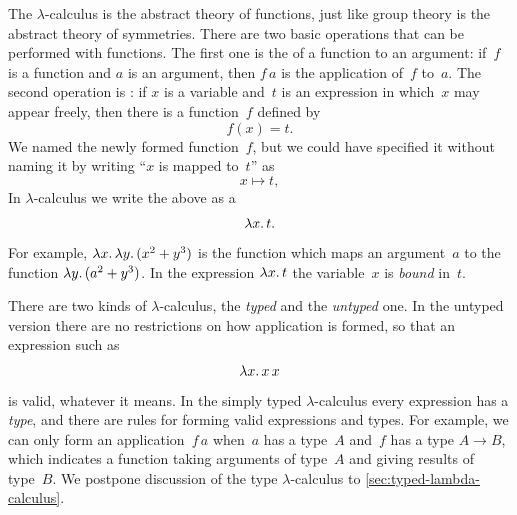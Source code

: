The $\lambda$-calculus is the abstract theory of functions, just like
group theory is the abstract theory of symmetries. There are two basic
operations that can be performed with functions. The first one is the
 of a function to an argument: if~$f$ is a function
and $a$ is an argument, then $f\,a$ is the application of~$f$ to~$a$.
The second operation is : if $x$ is a variable
and~$t$ is an expression in which~$x$ may appear freely, then there is
a function~$f$ defined by
%
\begin{equation*}
  f(x) = t.
\end{equation*}
%
We named the newly formed function~$f$, but we could
have specified it without naming it by writing ``$x$ is mapped to~$t$'' as
%
\begin{equation*}
  x \mapsto t,
\end{equation*}
%
In $\lambda$-calculus we write the above as a 
%
\begin{equation*}
  \lambda x .\,t.
\end{equation*}
%
For example, $\lambda x .\,\lambda y .\,(x^2 + y^3)$ is the function which maps an
argument~$a$ to the function $\lambda y .\,(a^2 + y^3)$. In the expression
$\lambda x .\,t$ the variable~$x$ is \emph{bound} in~$t$.

There are two kinds of $\lambda$-calculus, the \emph{typed} and the
\emph{untyped} one. In the untyped version there are no restrictions
on how application is formed, so that an expression such as
%
\begin{equation*}
  \lambda x .\,x\,x
\end{equation*}
%
is valid, whatever it means. In the simply typed $\lambda$-calculus every
expression has a \emph{type}, and there are rules for forming valid
expressions and types. For example, we can only form an
application~$f\,a$ when~$a$ has a type~$A$ and~$f$ has a type $A \to
B$, which indicates a function taking arguments of type~$A$ and giving
results of type~$B$. We postpone discussion of the type
$\lambda$-calculus to \cref{sec:typed-lambda-calculus}.

